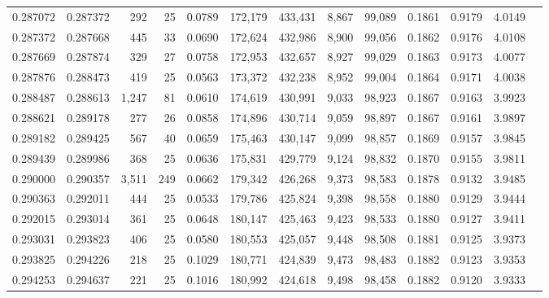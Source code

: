 \begin{tabular}{rrrrrrrrrrrrr}
0.287072 & 0.287372 &   292 &  25 &                                     0.0789 & 172,179 & 433,431 &   8,867 &  99,089 & 0.1861 & 0.9179 & 4.0149 \\
0.287372 & 0.287668 &   445 &  33 &                                     0.0690 & 172,624 & 432,986 &   8,900 &  99,056 & 0.1862 & 0.9176 & 4.0108 \\
0.287669 & 0.287874 &   329 &  27 &                                     0.0758 & 172,953 & 432,657 &   8,927 &  99,029 & 0.1863 & 0.9173 & 4.0077 \\
0.287876 & 0.288473 &   419 &  25 &                                     0.0563 & 173,372 & 432,238 &   8,952 &  99,004 & 0.1864 & 0.9171 & 4.0038 \\
0.288487 & 0.288613 & 1,247 &  81 &                                     0.0610 & 174,619 & 430,991 &   9,033 &  98,923 & 0.1867 & 0.9163 & 3.9923 \\
0.288621 & 0.289178 &   277 &  26 &                                     0.0858 & 174,896 & 430,714 &   9,059 &  98,897 & 0.1867 & 0.9161 & 3.9897 \\
0.289182 & 0.289425 &   567 &  40 &                                     0.0659 & 175,463 & 430,147 &   9,099 &  98,857 & 0.1869 & 0.9157 & 3.9845 \\
0.289439 & 0.289986 &   368 &  25 &                                     0.0636 & 175,831 & 429,779 &   9,124 &  98,832 & 0.1870 & 0.9155 & 3.9811 \\
0.290000 & 0.290357 & 3,511 & 249 &                                     0.0662 & 179,342 & 426,268 &   9,373 &  98,583 & 0.1878 & 0.9132 & 3.9485 \\
0.290363 & 0.292011 &   444 &  25 &                                     0.0533 & 179,786 & 425,824 &   9,398 &  98,558 & 0.1880 & 0.9129 & 3.9444 \\
0.292015 & 0.293014 &   361 &  25 &                                     0.0648 & 180,147 & 425,463 &   9,423 &  98,533 & 0.1880 & 0.9127 & 3.9411 \\
0.293031 & 0.293823 &   406 &  25 &                                     0.0580 & 180,553 & 425,057 &   9,448 &  98,508 & 0.1881 & 0.9125 & 3.9373 \\
0.293825 & 0.294226 &   218 &  25 &                                     0.1029 & 180,771 & 424,839 &   9,473 &  98,483 & 0.1882 & 0.9123 & 3.9353 \\
0.294253 & 0.294637 &   221 &  25 &                                     0.1016 & 180,992 & 424,618 &   9,498 &  98,458 & 0.1882 & 0.9120 & 3.9333 \\

\end{tabular}
